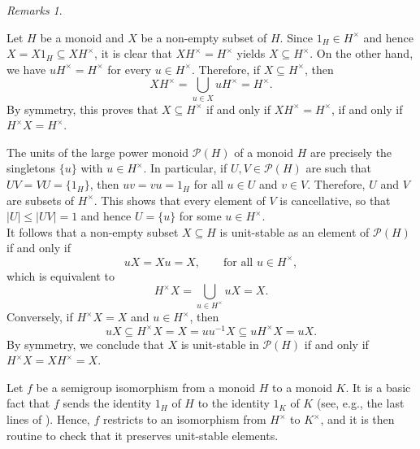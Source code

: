 \documentclass[11pt,reqno]{amsart}
\theoremstyle{definition}
\theoremstyle{remark}
\newtheorem{remarks}[theorem]{Remarks}
\theoremstyle{theoremdd}
\renewcommand{\,}{\kern 0.1em}
\begin{document}
\begin{remarks}
\label{remarks:units-and-unit-stability}
\begin{enumerate*}[label=\textup{(\arabic{*})}, mode=unboxed]
\item\label{remarks:units-and-unit-stability(1)} Let $H$ be a monoid and $X$ be a non-empty subset of $H$. Since $1_H \in H^\times$ and hence $X = \allowbreak X 1_H \subseteq XH^\times$, it is clear that $XH^\times = H^\times$ yields $X \subseteq H^\times$. On the other hand, we have $uH^\times = \allowbreak H^\times$ for every $u \in H^\times$. Therefore, if $X \subseteq H^\times$, then 
\[
XH^\times = \bigcup_{u \in X} uH^\times = H^\times.
\]
By symmetry, this proves that $X \subseteq H^\times$ if and only if $XH^\times = H^\times$, if and only if $H^\times X = H^\times$.
\end{enumerate*}

\vskip 0.05cm

\begin{enumerate*}[label=\textup{(\arabic{*})}, resume, mode=unboxed]
\item\label{remarks:units-and-unit-stability(2)} 
The units of the large power monoid $\mathcal{P}(H)$ of a monoid $H$ are precisely 
the singletons $\{u\}$ with $u \in H^\times$. 
In particular, if $U, V \in \mathcal{P}(H)$ are such that $UV = VU = \{1_H\}$, 
then $uv = vu = 1_H$ for all $u \in U$ and $v \in V$. Therefore, $U$ and $V$ 
are subsets of $H^\times$. This shows that every element of $V$ is cancellative, so that $|U| \le |UV| = 1$ and hence $U = \{u\}$ for some $u \in H^\times$.\\

\indent{}It follows that a non-empty subset $X \subseteq H$ is unit-stable as an element of 
$\mathcal{P}(H)$ if and only if 
\[
uX = Xu = X, \qquad \text{for all } u \in H^\times,
\]
which is equivalent to 
\[
H^\times X = \bigcup_{u \in H^\times} uX = X. 
\]
Conversely, if $H^\times X = X$ and $u \in H^\times$, then 
\[
uX \subseteq H^\times X = X = u u^{-1}X \subseteq u H^\times X = uX.
\]
By symmetry, we conclude that $X$ is unit-stable in 
$\mathcal{P}(H)$ if and only if $
H^\times X = XH^\times = X$.
\end{enumerate*}

\vskip 0.05cm

\begin{enumerate*}[label=\textup{(\arabic{*})}, resume, mode=unboxed]
\item\label{remarks:units-and-unit-stability(3)} Let $f$ be a semigroup isomorphism from a monoid $H$ to a monoid $K$. 
It is a basic fact that $f$ sends the identity $1_H$ of $H$ to the identity $1_K$ of $K$ 
(see, e.g., the last lines of \cite[Sect.~2]{Tri-2025(c)}). Hence, $f$ restricts to an isomorphism from $H^\times$ to $K^\times$, 
and it is then routine to check that it preserves unit-stable elements.
\end{enumerate*}
\end{remarks}
\end{document}
